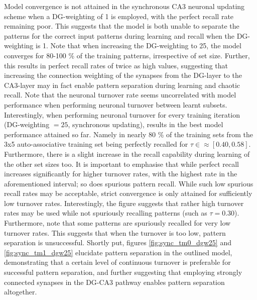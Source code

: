 Model convergence is not attained in the synchronous CA3 neuronal updating scheme when a DG-weighting of 1 is employed, with the perfect recall rate remaining poor. This suggests that the model is both unable to separate the patterns for the correct input patterns during learning and recall when the DG-weighting is 1.
Note that when increasing the DG-weighting to 25, the model converges for 80-100 \% of the training patterns, irrespective of set size. Further, this results in perfect recall rates of twice as high values, suggesting that increasing the connection weighting of the synapses from the DG-layer to the CA3-layer may in fact enable pattern separation during learning and chaotic recall. 
Note that the neuronal turnover rate seems uncorrelated with model performance when performing neuronal turnover between learnt subsets. Interestingly, when performing neuronal turnover for every training iteration (DG-weighting $= 25$, synchronous updating), results in the best model performance attained so far. Namely in  nearly 80 \% of the training sets from the 3x5 auto-associative training set being perfectly recalled for $\tau\in\approx[0.40, 0.58]$.
Furthermore, there is a slight increase in the recall capability during learning of the other set sizes too. It is important to emphasise that while perfect recall increases significantly for higher turnover rates, with the highest rate in the aforementioned interval; so does spurious pattern recall. While such low spurious recall rates may be acceptable, strict convergence is only attained for sufficiently low turnover rates. Interestingly, the figure suggests that rather high turnover rates may be used while not spuriously recalling patterns (such as $\tau=0.30$). Furthermore, note that some patterns are spuriously recalled for very low turnover rates. This suggests that when the turnover is too low, pattern separation is unsuccessful.
Shortly put, figures \ref{fig:sync_tm0_dgw25} and \ref{fig:sync_tm1_dgw25} elucidate pattern separation in the outlined model, demonstrating that a certain level of continuous turnover is preferable for successful pattern separation, and further suggesting that employing strongly connected synapses in the DG-CA3 pathway enables pattern separation altogether.

